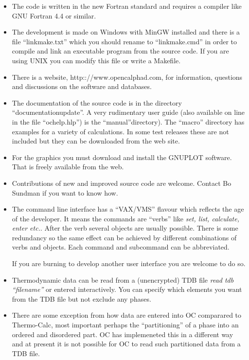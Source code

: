 \documentclass[12pt]{article}
\begin{document}
\begin{itemize}
\item The code is written in the new Fortran standard and requires 
a compiler like GNU Fortran 4.4 or similar.

\item The development is made on Windows with MinGW installed and
there is a file ``linkmake.txt'' which you should rename to
``linkmake.cmd'' in order to compile and link an executable program
from the source code.  If you are using UNIX you can modify this file
or write a Makefile.

\item There is a website, http:://www.opencalphad.com, for
information, questions and discussions on the software and databases.

\item The documentation of the source code is in the directory
``documentationupdate''.  A very rudimentary user guide (also
available on line in the file ``ochelp.hlp'') is the
``manual''directory).  The ``macro'' directory has examples for a
variety of calculations.  In some test releases these are not included
but they can be downloaded from the web site.

\item For the graphics you must download and install the GNUPLOT
  software.  That is freely available from the web.

\item Contributions of new and improved source code are welcome.
Contact Bo Sundman if you want to know how.

\item The command line interface has a ``VAX/VMS'' flavour which
reflects the age of the developer.  It means the commands are
``verbs'' like {\em set, list, calculate, enter etc.}.  After the verb
several objects are usually possible.  There is some redundancy so the
same effect can be achieved by different combinations of verbs and
objects.  Each command and subcommand can be abbreviated.

If you are burning to develop another user interface you are welcome
to do so.

\item Thermodynamic data can be read from a (unencrypted) TDB file
{\em read tdb ``filename''} or entered interactively.  You can specify
which elements you want from the TDB file but not exclude any phases.

\item There are some exception from how data are entered into OC
comparared to Thermo-Calc, most important perhaps the ``partitioning''
of a phase into an ordered and disordered part.  OC has implemeneted
this in a different way and at present it is not possible for OC to
read such partitioned data from a TDB file.


\end{itemize}
\end{document}
